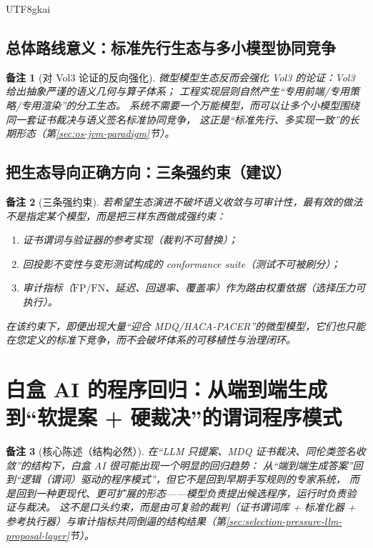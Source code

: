 \documentclass[12pt]{article}
\newtheorem{remark}{备注}[section]
\begin{document}
\begin{CJK*}{UTF8}{gkai}
\subsection{总体路线意义：标准先行生态与多小模型协同竞争}
\label{subsec:ecosystem-meaning}

\begin{remark}[对 Vol3 论证的反向强化]
微型模型生态反而会强化 Vol3 的论证：Vol3 给出抽象严谨的语义几何与算子体系；
工程实现层则自然产生“专用前端/专用策略/专用渲染”的分工生态。
系统不需要一个万能模型，而可以让多个小模型围绕同一套证书裁决与语义签名标准协同竞争，
这正是“标准先行、多实现一致”的长期形态（第\ref{sec:os-jvm-paradigm}节）。
\end{remark}

\subsection{把生态导向正确方向：三条强约束（建议）}
\label{subsec:steering-constraints}

\begin{remark}[三条强约束]
若希望生态演进不破坏语义收敛与可审计性，最有效的做法不是指定某个模型，而是把三样东西做成强约束：
\begin{enumerate}
  \item 证书谓词与验证器的参考实现（裁判不可替换）；
  \item 回投影不变性与变形测试构成的 conformance suite（测试不可被刷分）；
  \item 审计指标（$\mathrm{FP}/\mathrm{FN}$、延迟、回退率、覆盖率）作为路由权重依据（选择压力可执行）。
\end{enumerate}
在该约束下，即便出现大量“迎合 MDQ/HACA-PACER”的微型模型，它们也只能在您定义的标准下竞争，而不会破坏体系的可移植性与治理闭环。
\end{remark}

\clearpage

\section{白盒 AI 的程序回归：从端到端生成到“软提案 + 硬裁决”的谓词程序模式}
\label{sec:whitebox-program-regression}

\begin{remark}[核心陈述（结构必然）]
在“LLM 只提案、MDQ 证书裁决、同伦类签名收敛”的结构下，白盒 AI 很可能出现一个明显的回归趋势：
从“端到端生成答案”回到“逻辑（谓词）驱动的程序模式”，但它不是回到早期手写规则的专家系统，
而是回到一种更现代、更可扩展的形态——\emph{模型负责提出候选程序，运行时负责验证与裁决}。
这不是口头约束，而是由可复验的裁判（证书谓词库 + 标准化器 + 参考执行器）与审计指标共同倒逼的结构结果（第\ref{sec:selection-pressure-llm-proposal-layer}节）。
\end{remark}


\end{CJK*}
\end{document}
